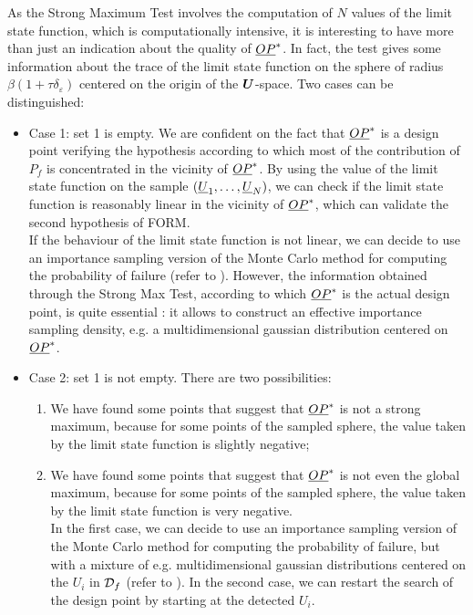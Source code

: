 As the Strong Maximum Test involves the computation of $N$ values of the limit state function, which is computationally intensive, it is interesting to have more than just an indication about the quality of ${\underline{OP}}^*$. In fact, the test gives some information about the trace of the limit state function on the sphere of radius $\beta(1+\tau \delta_{\varepsilon})$ centered on the origin of the ${\boldsymbol{U}}$-space. Two cases can be distinguished:
\begin{itemize}
\item Case 1: set 1 is empty. We are confident on the fact that ${\underline{OP}}^*$ is a design point verifying the hypothesis according to which most of the contribution of $P_f$ is concentrated in the vicinity of ${\underline{OP}}^*$. By using the value of the limit state function on the sample $({\underline{U}}_1, \dots, {\underline{U}}_N)$, we can check if the limit state function is reasonably linear in the vicinity of ${\underline{OP}}^*$, which can validate the second hypothesis of FORM. \\
  If the behaviour of the limit state function is not linear, we can decide to use an importance sampling version of the Monte Carlo method for computing the probability of failure (refer to ). However, the information obtained through the Strong Max Test, according to which ${\underline{OP}}^*$ is the actual design point, is quite essential : it allows to construct an effective importance sampling density, e.g. a multidimensional gaussian distribution centered on ${\underline{OP}}^*$.
\item Case 2:   set 1 is not empty. There are two possibilities:
  \begin{enumerate}
  \item We have found some points that suggest that ${\underline{OP}}^*$ is not a strong maximum, because for some points of the sampled sphere, the value taken by the limit state function is slightly negative;
  \item We have found some points that suggest that ${\underline{OP}}^*$ is not even the global maximum, because for some points of the sampled sphere, the value taken by the limit state function is very negative.\\
    In the first case, we can decide to use an importance sampling version of the Monte Carlo method for computing the probability of failure, but with a mixture of e.g. multidimensional gaussian distributions centered on the $U_i$ in ${\mathcal D}_f$ (refer to ).
    In the second case, we can restart the search of the design point by starting at the detected $U_i$.
  \end{enumerate}
\end{itemize}

